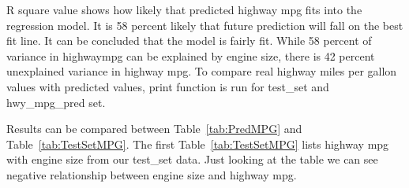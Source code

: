  R square value shows how likely that predicted highway mpg fits into the
 regression model. It is 58 percent likely that future prediction will fall
 on the best fit line. It can be concluded that the model is fairly fit. While 
 58 percent of variance in highwaympg can be explained by engine size,
 there is 42 percent unexplained
 variance in highway mpg. To compare real highway miles per gallon values with 
 predicted values, print function is
 run for test\_set and hwy\_mpg\_pred set.
 
 Results can be compared between Table~\ref{tab:PredMPG} 
 and Table~\ref{tab:TestSetMPG}. 
 The first Table~\ref{tab:TestSetMPG} lists highway mpg with engine size 
 from our test\_set data. Just looking at the table we can see negative 
 relationship between engine size and highway mpg. 
 
